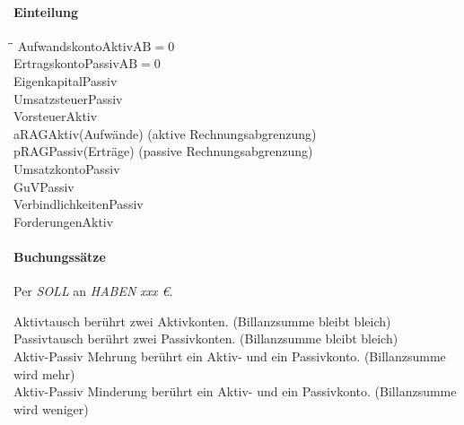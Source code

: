 \paragraph{Einteilung}
\begin{tabbing}
	\hspace{5cm}\=\hspace{2cm}\=\kill
	Aufwandskonto\>Aktiv\>$\text{AB}=0$\\
	Ertragskonto\>Passiv\>$\text{AB}=0$\\
	Eigenkapital\>Passiv\\
	Umsatzsteuer\>Passiv\\
	Vorsteuer\>Aktiv\\
	aRAG\>Aktiv\>(Aufwände) (aktive Rechnungsabgrenzung)\\
	pRAG\>Passiv\>(Erträge) (passive Rechnungsabgrenzung)\\
	Umsatzkonto\>Passiv\\
	GuV\>Passiv\\
	Verbindlichkeiten\>Passiv\\
	Forderungen\>Aktiv\\
\end{tabbing}

\paragraph{Buchungssätze} Per \emph{SOLL} an \emph{HABEN} \emph{xxx \euro}.

Aktivtausch berührt zwei Aktivkonten. (Billanzsumme bleibt bleich)\\
Passivtausch berührt zwei Passivkonten. (Billanzsumme bleibt bleich)\\
Aktiv-Passiv Mehrung berührt ein Aktiv- und ein Passivkonto. (Billanzsumme wird mehr)\\
Aktiv-Passiv Minderung berührt ein Aktiv- und ein Passivkonto. (Billanzsumme wird weniger)